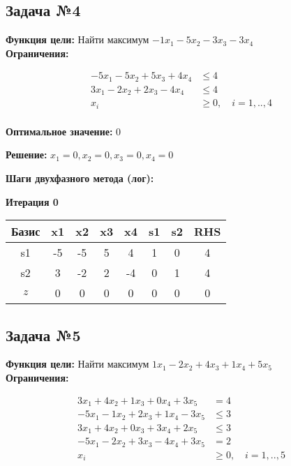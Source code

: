 \documentclass[a4paper,12pt]{article}
\begin{document}
\subsection*{Задача №4}
\textbf{Функция цели: }
Найти максимум $ -1x_{1} -5x_{2} -3x_{3} -3x_{4} $\\

\textbf{Ограничения:}

\[ \begin{aligned}
-5x_{1} -5x_{2} +5x_{3} +4x_{4} &\le 4 \\
3x_{1} -2x_{2} +2x_{3} -4x_{4} &\le 4 \\
x_i &\ge 0,\quad i=1,..,4\\
\end{aligned}\]

\textbf{Оптимальное значение: }$0$

\textbf{Решение: }$x_{1}=0, x_{2}=0, x_{3}=0, x_{4}=0$

\textbf{Шаги двухфазного метода (лог):}


 \textbf{Итерация 0}\\
\begin{tabular}{|c|c|c|c|c|c|c|c|}
\hline
Базис & x1 & x2 & x3 & x4 & s1 & s2 & RHS \\ \hline
s1 & -5 & -5 & 5 & 4 & 1 & 0 & 4 \\ \hline
s2 & 3 & -2 & 2 & -4 & 0 & 1 & 4 \\ \hline
$z$ & 0 & 0 & 0 & 0 & 0 & 0 & 0 \\ \hline
\end{tabular}
\vspace{5mm}



\subsection*{Задача №5}
\textbf{Функция цели: }
Найти максимум $ 1x_{1} -2x_{2} +4x_{3} +1x_{4} +5x_{5} $\\

\textbf{Ограничения:}

\[ \begin{aligned}
3x_{1} +4x_{2} +1x_{3} +0x_{4} +3x_{5} &= 4 \\
-5x_{1} -1x_{2} +2x_{3} +1x_{4} -3x_{5} &\le 3 \\
3x_{1} +4x_{2} +0x_{3} +3x_{4} +2x_{5} &\le 3 \\
-5x_{1} -2x_{2} +3x_{3} -4x_{4} +3x_{5} &= 2 \\
x_i &\ge 0,\quad i=1,..,5\\
\end{aligned}\]
\end{document}
